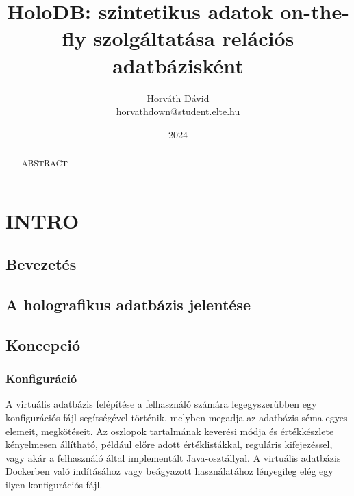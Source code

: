 \documentclass[
    parspace,
    noindent,
    nohyp,
]{elteiktdk}[2023/04/10]
\title{HoloDB: szintetikus adatok on-the-fly szolgáltatása relációs adatbázisként}
\date{2024}
\author{Horváth Dávid \\ {\small\href{mailto:horvathdown@student.elte.hu}{horvathdown@student.elte.hu}} }
\affiliation{Mesteroktató}
\begin{document}

\listoftodos
\cleardoublepage

\makecover
\cleardoublepage

\maketitle

\tableofcontents
\cleardoublepage


\begin{abstract}
ABSTRACT
\end{abstract}



\chapter{INTRO}

\section{Bevezetés}

\section{A holografikus adatbázis jelentése}


\section{Koncepció}

\subsection{Konfiguráció}


A virtuális adatbázis felépítése a felhasználó számára legegyszerűbben
egy konfigurációs fájl segítségével történik,
melyben megadja az adatbázis-séma egyes elemeit, megkötéseit.
Az oszlopok tartalmának keverési módja és értékkészlete kényelmesen állítható,
például előre adott értéklistákkal, reguláris kifejezéssel,
vagy akár a felhasználó által implementált Java-osztállyal.
A virtuális adatbázis Dockerben való indításához vagy beágyazott használatához
lényegileg elég egy ilyen konfigurációs fájl.
\end{document}
